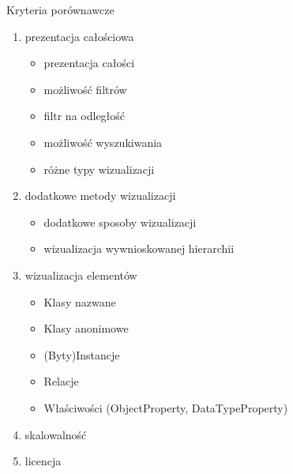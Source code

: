 Kryteria porównawcze
\begin{enumerate}
 \item prezentacja całościowa
  \begin{itemize}
   \item prezentacja całości
  \item możliwość filtrów
  \item filtr na odległość
  \item możliwość wyszukiwania
  \item różne typy wizualizacji
  
  
  \end{itemize}
 \item dodatkowe metody wizualizacji
   \begin{itemize}
    \item dodatkowe sposoby wizualizacji
    \item wizualizacja wywnioskowanej hierarchii
  \end{itemize}

\item wizualizacja elementów
  \begin{itemize}
    \item Klasy nazwane
    \item Klasy anonimowe
    \item (Byty)Instancje
    \item Relacje
    \item Właściwości (ObjectProperty, DataTypeProperty)

  \end{itemize}
\item skalowalność
\item licencja



\end{enumerate}


